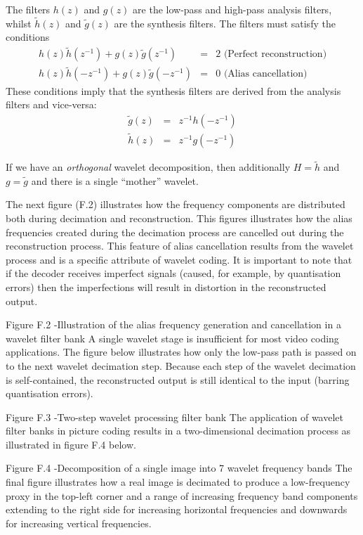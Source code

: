 The filters $h(z)$ and $g(z)$ are the low-pass and high-pass analysis 
filters, whilst $\tilde{h}(z)$ and $\tilde{g}(z)$ are the 
synthesis filters. The filters must satisfy the conditions
\begin{eqnarray*}
h(z)\tilde{h}(z^{-1})+g(z)\tilde{g}(z^{-1}) & = & 2 \text{ (Perfect reconstruction)}\\
h(z)\tilde{h}(-z^{-1})+g(z)\tilde{g}(-z^{-1}) & = & 0 \text{ (Alias cancellation)}
\end{eqnarray*}
These conditions imply that the synthesis filters are derived from the analysis filters and vice-versa:
\begin{eqnarray*}
\tilde{g}(z) & = & z^{-1}h(-z^{-1}) \\
\tilde{h}(z) & = & z^{-1}g(-z^{-1})
\end{eqnarray*}

If we have an {\em orthogonal} wavelet decomposition, then additionally $H=\tilde{h}$ and $g=\tilde{g}$
and there is a single ``mother'' wavelet.
 
The next figure (F.2) illustrates how the frequency components are distributed both during decimation and reconstruction. This figures illustrates how the alias frequencies created during the decimation process are cancelled out during the reconstruction process. This feature of alias cancellation results from the wavelet process and is a specific attribute of wavelet coding. It is important to note that if the decoder receives imperfect signals (caused, for example, by quantisation errors) then the imperfections will result in distortion in the reconstructed output.

 
Figure F.2 -Illustration of the alias frequency generation and cancellation in a wavelet filter bank
A single wavelet stage is insufficient for most video coding applications. The figure below illustrates how only the low-pass path is passed on to the next wavelet decimation step. Because each step of the wavelet decimation is self-contained, the reconstructed output is still identical to the input (barring quantisation errors).
 
Figure F.3 -Two-step wavelet processing filter bank
The application of wavelet filter banks in picture coding results in a two-dimensional decimation process as illustrated in figure F.4 below.
 
Figure F.4 -Decomposition of a single image into 7 wavelet frequency bands
The final figure illustrates how a real image is decimated to produce a low-frequency proxy in the top-left corner and a range of increasing frequency band components extending to the right side for increasing horizontal frequencies and downwards for increasing vertical frequencies.
 
